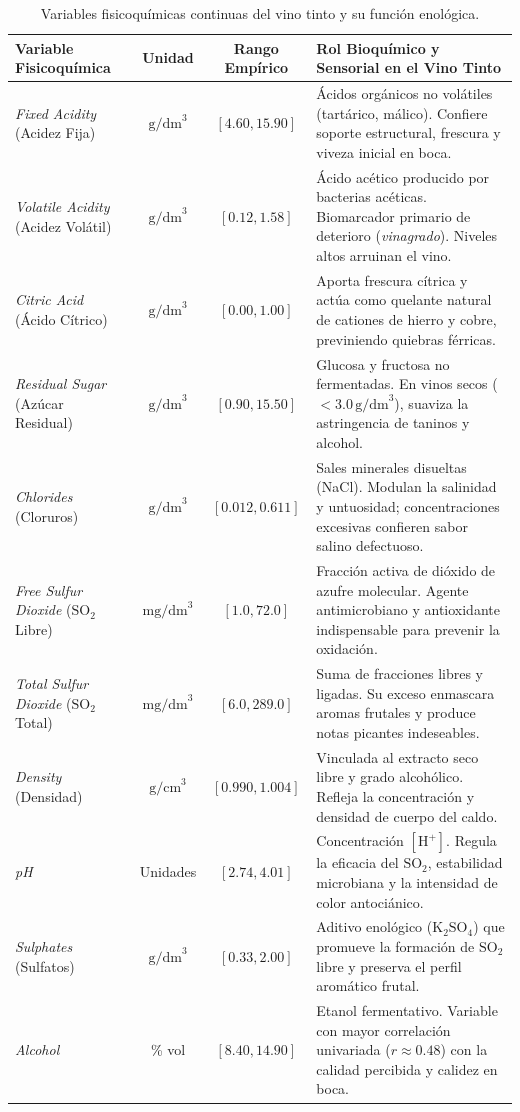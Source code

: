 \documentclass{article}
\begin{document}
\begin{table}[H]
\centering
\caption{Variables fisicoquímicas continuas del vino tinto y su función enológica.}
\label{tab:variables_quimicas}
\small
\begin{tabularx}{\textwidth}{p{3.2cm}ccX}
\toprule
\textbf{Variable Fisicoquímica} & \textbf{Unidad} & \textbf{Rango Empírico} & \textbf{Rol Bioquímico y Sensorial en el Vino Tinto} \\
\midrule
\textit{Fixed Acidity} (Acidez Fija) & $\text{g/dm}^3$ & $[4.60, 15.90]$ & Ácidos orgánicos no volátiles (tartárico, málico). Confiere soporte estructural, frescura y viveza inicial en boca. \\
\textit{Volatile Acidity} (Acidez Volátil) & $\text{g/dm}^3$ & $[0.12, 1.58]$ & Ácido acético producido por bacterias acéticas. Biomarcador primario de deterioro (\textit{vinagrado}). Niveles altos arruinan el vino. \\
\textit{Citric Acid} (Ácido Cítrico) & $\text{g/dm}^3$ & $[0.00, 1.00]$ & Aporta frescura cítrica y actúa como quelante natural de cationes de hierro y cobre, previniendo quiebras férricas. \\
\textit{Residual Sugar} (Azúcar Residual) & $\text{g/dm}^3$ & $[0.90, 15.50]$ & Glucosa y fructosa no fermentadas. En vinos secos ($<3.0\,\text{g/dm}^3$), suaviza la astringencia de taninos y alcohol. \\
\textit{Chlorides} (Cloruros) & $\text{g/dm}^3$ & $[0.012, 0.611]$ & Sales minerales disueltas (NaCl). Modulan la salinidad y untuosidad; concentraciones excesivas confieren sabor salino defectuoso. \\
\textit{Free Sulfur Dioxide} ($\text{SO}_2$ Libre) & $\text{mg/dm}^3$ & $[1.0, 72.0]$ & Fracción activa de dióxido de azufre molecular. Agente antimicrobiano y antioxidante indispensable para prevenir la oxidación. \\
\textit{Total Sulfur Dioxide} ($\text{SO}_2$ Total) & $\text{mg/dm}^3$ & $[6.0, 289.0]$ & Suma de fracciones libres y ligadas. Su exceso enmascara aromas frutales y produce notas picantes indeseables. \\
\textit{Density} (Densidad) & $\text{g/cm}^3$ & $[0.990, 1.004]$ & Vinculada al extracto seco libre y grado alcohólico. Refleja la concentración y densidad de cuerpo del caldo. \\
\textit{pH} & Unidades & $[2.74, 4.01]$ & Concentración $[\text{H}^+]$. Regula la eficacia del $\text{SO}_2$, estabilidad microbiana y la intensidad de color antociánico. \\
\textit{Sulphates} (Sulfatos) & $\text{g/dm}^3$ & $[0.33, 2.00]$ & Aditivo enológico ($\text{K}_2\text{SO}_4$) que promueve la formación de $\text{SO}_2$ libre y preserva el perfil aromático frutal. \\
\textit{Alcohol} & \% vol & $[8.40, 14.90]$ & Etanol fermentativo. Variable con mayor correlación univariada ($r \approx 0.48$) con la calidad percibida y calidez en boca. \\
\bottomrule
\end{tabularx}
\end{table}
\end{document}
